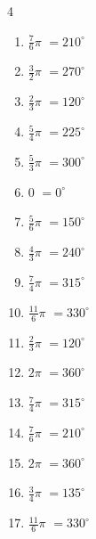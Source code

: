 \begin{multicols}{4}
\begin{enumerate}
  \item $\displaystyle \frac{7}{6}\pi$
        $\displaystyle =210^{\circ}$

\columnbreak %

  \item $\displaystyle \frac{3}{2}\pi$
        $\displaystyle =270^{\circ}$

  \item $\displaystyle \frac{2}{3}\pi$
        $\displaystyle =120^{\circ}$

  \item $\displaystyle \frac{5}{4}\pi$
        $\displaystyle =225^{\circ}$

  \item $\displaystyle \frac{5}{3}\pi$
        $\displaystyle =300^{\circ}$

  \item $\displaystyle 0$
        $\displaystyle =0^{\circ}$

  \item $\displaystyle \frac{5}{6}\pi$
        $\displaystyle =150^{\circ}$

  \item $\displaystyle \frac{4}{3}\pi$
        $\displaystyle =240^{\circ}$

  \item $\displaystyle \frac{7}{4}\pi$
        $\displaystyle =315^{\circ}$

  \item $\displaystyle \frac{11}{6}\pi$
        $\displaystyle =330^{\circ}$

  \item $\displaystyle \frac{2}{3}\pi$
        $\displaystyle =120^{\circ}$

  \item $\displaystyle 2\pi$
        $\displaystyle =360^{\circ}$

  \item $\displaystyle \frac{7}{4}\pi$
        $\displaystyle =315^{\circ}$

  \item $\displaystyle \frac{7}{6}\pi$
        $\displaystyle =210^{\circ}$

  \item $\displaystyle 2\pi$
        $\displaystyle =360^{\circ}$

  \item $\displaystyle \frac{3}{4}\pi$
        $\displaystyle =135^{\circ}$

  \item $\displaystyle \frac{11}{6}\pi$
        $\displaystyle =330^{\circ}$


\end{enumerate}
\end{multicols}

